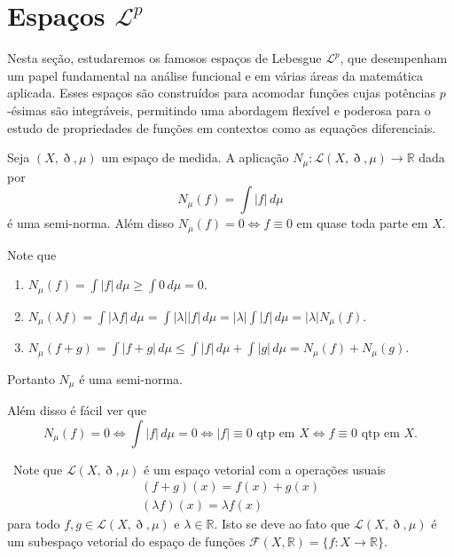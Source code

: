 \documentclass[a4paper, 11pt]{book}
\theoremstyle{definition}
\newcommand{\obs}{\noindent{\textbf{\textcolor{black}{\sffamily Observação:}}}~}
\newcommand{\bR}{\mathbb{R}}
\newcommand{\cL}{\mathcal{L}}
\begin{document}
\section{Espaços $\mathcal{L}^p$}

Nesta seção, estudaremos os famosos espaços de Lebesgue $\mathcal{L}^p$, que desempenham um papel fundamental na análise funcional e em várias áreas da matemática aplicada. Esses espaços são construídos para acomodar funções cujas potências $p$-ésimas são integráveis, permitindo uma abordagem flexível e poderosa para o estudo de propriedades de funções em contextos como as equações diferenciais.

\begin{pbox} \label{pr:semi-norma}
    Seja $(X, \eth, \mu)$ um espaço de medida. A aplicação $N_\mu : \cL(X, \eth, \mu) \to \bR$ dada por
    \[
        N_\mu(f) = \int |f| \, d\mu
    \]
    é uma semi-norma.
    Além disso $N_\mu(f) = 0 \iff f \equiv 0$ em quase toda parte em $X$.
\end{pbox}
\begin{prf} 
    Note que

    \begin{enumerate}
        \item $\displaystyle N_\mu(f) = \int |f| \, d\mu \geqslant \int 0 \,d\mu = 0.$
        \item $\displaystyle N_\mu(\lambda f) = \int |\lambda f| \, d\mu = \int |\lambda||f| \,d\mu = |\lambda|\int|f| \,d\mu = |\lambda| N_\mu(f)$.
        \item $\displaystyle N_\mu(f + g) = \int | f+ g| \,d\mu \leqslant \int |f| \,d\mu + \int |g| \, d\mu = N_\mu(f) + N_\mu(g)$.
    \end{enumerate}
    Portanto $N_\mu$ é uma semi-norma.

    Além disso é fácil ver que
    \[
        N_\mu(f) = 0 \iff \int |f| \,d\mu = 0 \iff |f| \equiv 0 \text{ qtp em } X \iff f \equiv 0 \text{ qtp em } X.
    \]
\end{prf}

\obs Note que $\mathcal{L}(X,\eth,\mu)$ é um espaço vetorial com a operações usuais
\[
    \begin{gathered}
        (f + g)(x) = f(x) + g(x)\\
        (\lambda f)(x) = \lambda f(x)
    \end{gathered}
\]
para todo $f,g \in \mathcal{L}(X,\eth,\mu)$ e $\lambda \in \bR$.
Isto se deve ao fato que $\mathcal{L}(X,\eth,\mu)$ é um subespaço vetorial do espaço de funções $\mathcal{F}(X,\bR) = \{f: X \to \bR\}$.
\end{document}
